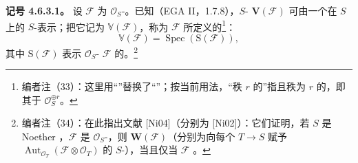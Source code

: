 \textbf{记号 4.6.3.1。} 设 $\mathcal F$ 为 $\mathcal O_S$-。已知（EGA II，1.7.8），$S$- $\mathbf V(\mathcal F)$ 可由一个在 $S$ 上的 $S$-表示；把它记为 $\mathbb V(\mathcal F)$，称为 $\mathcal F$ 所定义的\footnote{编者注（33）：这里用“”替换了“”；按当前用法，“秩 $r$ 的”指且秩为 $r$ 的，即其于 $\mathcal O_S^{\oplus r}$。}：
\[
\mathbb V(\mathcal F)=\operatorname{Spec}(\mathrm S(\mathcal F)),
\]
其中 $\mathrm S(\mathcal F)$ 表示 $\mathcal O_S$- $\mathcal F$ 的。\footnote{编者注（34）：在此指出文献 [Ni04]（分别为 [Ni02]）：它们证明，若 $S$ 是 Noether ，$\mathcal F$ 是 $\mathcal O_S$-，则 $\mathbf W(\mathcal F)$（分别为向每个 $T\to S$ 赋予 $\operatorname{Aut}_{\mathcal O_T}(\mathcal F\otimes\mathcal O_T)$ 的 $S$-），当且仅当 $\mathcal F$ 。}

